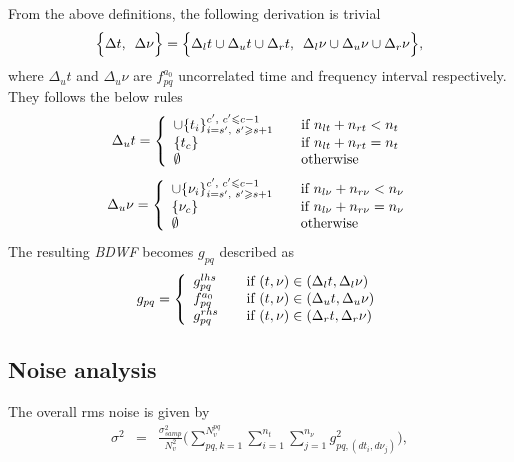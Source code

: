 \documentclass[useAMS,usenatbib]{mn2e}
\begin{document}
From the above definitions, the following derivation is trivial 
\begin{equation*}
 \Big\{\Delta t,\hspace{0.17cm}\Delta \nu \Big\}=\Big\{\Delta_l t \cup \Delta_u t \cup \Delta_r t, \hspace{0.17cm}\Delta_l \nu \cup 
\Delta_u \nu \cup \Delta_r \nu \Big\},
\end{equation*}
where $\Delta_u t$ and $\Delta_u \nu$ are $f_{pq}^{a_0}$ uncorrelated time  and frequency interval respectively. They follows the below 
rules 
\begin{eqnarray*}
 \Delta_u t= \left\{ 
  \begin{array}{l l}
     \cup\{t_i\}_{i=s',\hspace{0.1cm} s' \geq s+1}^{c', \hspace{0.1cm}c'\leq c-1} & \quad \text{if $n_{lt}+n_{rt}< n_t$}\\
      \{t_c\}& \quad \text{if $n_{lt}+n_{rt} = n_t$}\\
       \emptyset  & \quad \text{otherwise}
  \end{array} \right.
\end{eqnarray*}
\begin{eqnarray*}
 \Delta_u \nu= \left\{ 
  \begin{array}{l l}
     \cup\{\nu_i\}_{i=s',\hspace{0.1cm} s'\geq s+1}^{c', \hspace{0.1cm}c'\leq c-1} & \quad \text{if $n_{l\nu}+n_{r\nu} < n_{\nu}$}\\
      \{\nu_c\}& \quad \text{if $n_{l\nu}+n_{r\nu} = n_{\nu}$}\\
       \emptyset  & \quad \text{otherwise}
  \end{array} \right.
\end{eqnarray*}
The resulting \textit{BDWF} becomes $g_{pq}$ described as
\begin{eqnarray*}
g_{pq} = \left\{ 
  \begin{array}{l l}
    g^{lhs}_{pq} & \quad \text{if $(t,\nu) \in (\Delta_l t, \Delta_l \nu)$}\\
    f^{a_0}_{pq} & \quad \text{if $(t,\nu) \in (\Delta_u t, \Delta_u \nu)$}\\
    g^{rhs}_{pq}& \quad \text{if $(t,\nu) \in (\Delta_r t, \Delta_r \nu)$}
  \end{array} \right.
\end{eqnarray*}
\subsection{Noise analysis}
The  overall rms noise is given by
\begin{eqnarray*}
\sigma^2	&=& 
\frac{\sigma^{2}_{samp} }{N_{v}^{2}}\Big(\sum_{pq,k=1}^{N_{v}^{pq}}\sum_{i=1}^{n_t}\sum_{j=1}^{n_{\nu}}g_{pq,(dt_i,d\nu_j)}^{2}\Big) 
,\label{Equ:OBDWnoise}
\end{eqnarray*}
\end{document}
